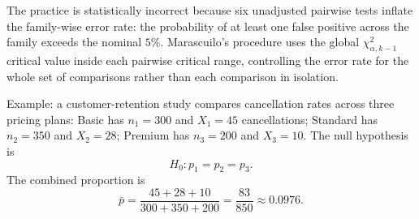 \begin{solproblema}[prob:cb7e8b6]
The practice is statistically incorrect because six unadjusted pairwise tests inflate the family-wise error rate: the probability of at least one false positive across the family exceeds the nominal $5\%$. Marascuilo's procedure uses the global $\chi^2_{\alpha,k-1}$ critical value inside each pairwise critical range, controlling the error rate for the whole set of comparisons rather than each comparison in isolation.
\end{solproblema}

\begin{solproblema}
Example: a customer-retention study compares cancellation rates across three pricing plans: Basic has $n_1=300$ and $X_1=45$ cancellations; Standard has $n_2=350$ and $X_2=28$; Premium has $n_3=200$ and $X_3=10$. The null hypothesis is
\[
	H_0:p_1=p_2=p_3.
\]
The combined proportion is
\[
	\bar p=\frac{45+28+10}{300+350+200}=\frac{83}{850}\approx0.0976.
\]
\end{solproblema}
